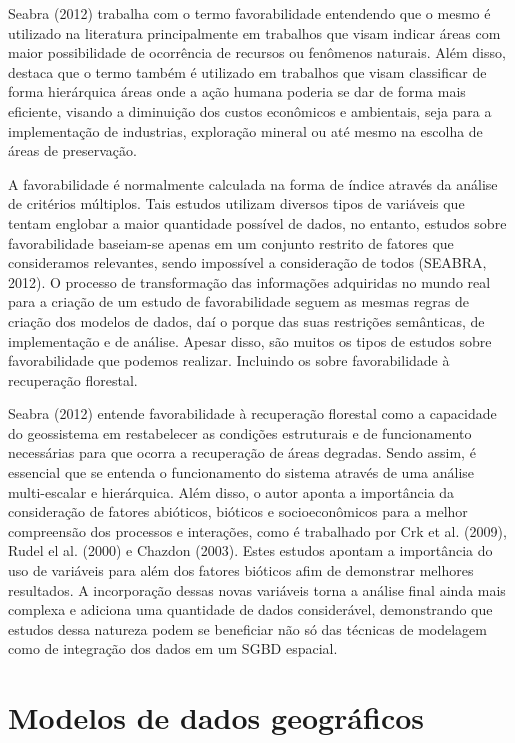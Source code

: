 	 Seabra (2012) trabalha com o termo favorabilidade entendendo que o mesmo é utilizado na literatura principalmente em trabalhos que visam indicar áreas com maior possibilidade de ocorrência de recursos ou fenômenos naturais. Além disso, destaca que o termo também é utilizado em trabalhos que visam classificar de forma hierárquica áreas onde a ação humana poderia se dar de forma mais eficiente, visando a diminuição dos custos econômicos e ambientais, seja para a implementação de industrias, exploração mineral ou até mesmo na escolha de áreas de preservação.
	 
	 A favorabilidade é normalmente calculada na forma de índice através da análise de critérios múltiplos. Tais estudos utilizam diversos tipos de variáveis que tentam englobar a maior quantidade possível de dados, no entanto, estudos sobre favorabilidade baseiam-se apenas em um conjunto restrito de fatores que consideramos relevantes, sendo impossível a consideração de todos (SEABRA, 2012). O processo de transformação das informações adquiridas no mundo real para a criação de um estudo de favorabilidade seguem as mesmas regras de criação dos modelos de dados, daí o porque das suas restrições semânticas, de implementação e de análise. Apesar disso, são muitos os tipos de estudos sobre favorabilidade que podemos realizar. Incluindo os sobre favorabilidade à recuperação florestal.
	 
	 Seabra (2012) entende favorabilidade à recuperação florestal como a capacidade do geossistema em restabelecer as condições estruturais e de funcionamento necessárias para que ocorra a recuperação de áreas degradas. Sendo assim, é essencial que se entenda o funcionamento do sistema através de uma análise multi-escalar e hierárquica. Além disso, o autor aponta a importância da consideração de fatores abióticos, bióticos e socioeconômicos para a melhor compreensão dos processos e interações, como é trabalhado por Crk et al. (2009), Rudel el al. (2000) e Chazdon (2003). Estes estudos apontam a importância do uso de variáveis para além dos fatores bióticos afim de demonstrar melhores resultados. A incorporação dessas novas variáveis torna a análise final ainda mais complexa e adiciona uma quantidade de dados considerável, demonstrando que estudos dessa natureza podem se beneficiar não só das técnicas de modelagem como de integração dos dados em um SGBD espacial.
	 
	 \section{Modelos de dados geográficos}
	 
